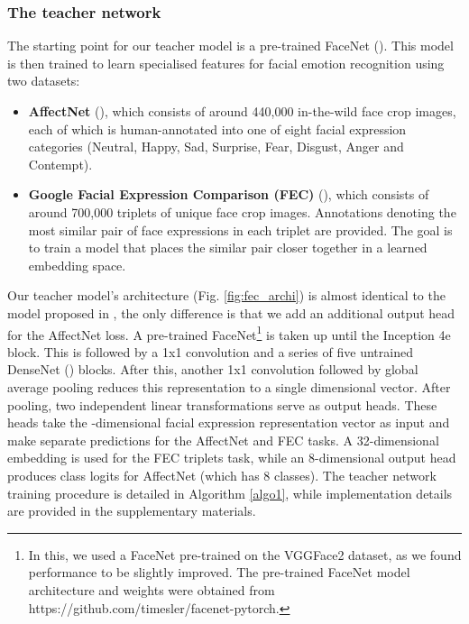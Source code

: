 \documentclass[times,twocolumn,final,authoryear]{elsarticle}
\begin{document}
	\subsubsection{The teacher network}
	\label{sec:teacher}
	
	The starting point for our teacher model is a pre-trained FaceNet (\cite{Schroff2015}). This model is then trained to learn specialised features for facial emotion recognition using two datasets:
	\begin{itemize}
		\item \textbf{AffectNet} (\cite{AffectNet}), which consists of around 440,000 in-the-wild face crop images, each of which is human-annotated into one of eight facial expression categories (Neutral, Happy, Sad, Surprise, Fear, Disgust, Anger and Contempt).
		\item \textbf{Google Facial Expression Comparison (FEC)} (\cite{GoogleFEC}), which consists of around 700,000 triplets of unique face crop images. Annotations denoting the most similar pair of face expressions in each triplet are provided. The goal is to train a model that places the similar pair closer together in a learned embedding space.
	\end{itemize}
	
	Our teacher model's architecture (Fig. \ref{fig:fec_archi}) is almost identical to the model proposed in \cite{GoogleFEC}, the only difference is that we add an additional output head for the AffectNet loss. A pre-trained FaceNet\footnote{In this, we used a FaceNet pre-trained on the VGGFace2 dataset, as we found performance to be slightly improved. The pre-trained FaceNet model architecture and weights were obtained from https://github.com/timesler/facenet-pytorch.} is taken up until the Inception 4e block. This is followed by a 1x1 convolution and a series of five untrained DenseNet (\cite{DenseNet}) blocks. After this, another 1x1 convolution followed by global average pooling reduces this representation to a single  dimensional vector. After pooling, two independent linear transformations serve as output heads. These heads take the -dimensional facial expression representation vector as input and make separate predictions for the AffectNet and FEC tasks. A 32-dimensional embedding is used for the FEC triplets task, while an 8-dimensional output head produces class logits for AffectNet (which has 8 classes). The teacher network training procedure is detailed in Algorithm \ref{algo1}, while implementation details are provided in the supplementary materials.
	
\end{document}
